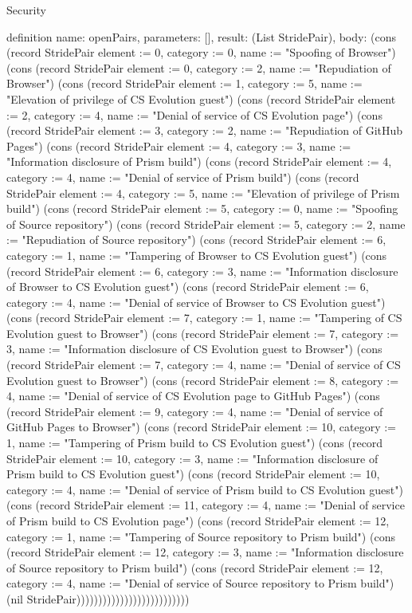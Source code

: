 \begin{lexlean}{Security}
\begin{semanticmodule}
definition{
  name: openPairs,
  parameters: [],
  result: (List StridePair),
  body: (cons (record StridePair {element := 0, category := 0, name := "Spoofing of Browser"}) (cons (record StridePair {element := 0, category := 2, name := "Repudiation of Browser"}) (cons (record StridePair {element := 1, category := 5, name := "Elevation of privilege of CS Evolution guest"}) (cons (record StridePair {element := 2, category := 4, name := "Denial of service of CS Evolution page"}) (cons (record StridePair {element := 3, category := 2, name := "Repudiation of GitHub Pages"}) (cons (record StridePair {element := 4, category := 3, name := "Information disclosure of Prism build"}) (cons (record StridePair {element := 4, category := 4, name := "Denial of service of Prism build"}) (cons (record StridePair {element := 4, category := 5, name := "Elevation of privilege of Prism build"}) (cons (record StridePair {element := 5, category := 0, name := "Spoofing of Source repository"}) (cons (record StridePair {element := 5, category := 2, name := "Repudiation of Source repository"}) (cons (record StridePair {element := 6, category := 1, name := "Tampering of Browser to CS Evolution guest"}) (cons (record StridePair {element := 6, category := 3, name := "Information disclosure of Browser to CS Evolution guest"}) (cons (record StridePair {element := 6, category := 4, name := "Denial of service of Browser to CS Evolution guest"}) (cons (record StridePair {element := 7, category := 1, name := "Tampering of CS Evolution guest to Browser"}) (cons (record StridePair {element := 7, category := 3, name := "Information disclosure of CS Evolution guest to Browser"}) (cons (record StridePair {element := 7, category := 4, name := "Denial of service of CS Evolution guest to Browser"}) (cons (record StridePair {element := 8, category := 4, name := "Denial of service of CS Evolution page to GitHub Pages"}) (cons (record StridePair {element := 9, category := 4, name := "Denial of service of GitHub Pages to Browser"}) (cons (record StridePair {element := 10, category := 1, name := "Tampering of Prism build to CS Evolution guest"}) (cons (record StridePair {element := 10, category := 3, name := "Information disclosure of Prism build to CS Evolution guest"}) (cons (record StridePair {element := 10, category := 4, name := "Denial of service of Prism build to CS Evolution guest"}) (cons (record StridePair {element := 11, category := 4, name := "Denial of service of Prism build to CS Evolution page"}) (cons (record StridePair {element := 12, category := 1, name := "Tampering of Source repository to Prism build"}) (cons (record StridePair {element := 12, category := 3, name := "Information disclosure of Source repository to Prism build"}) (cons (record StridePair {element := 12, category := 4, name := "Denial of service of Source repository to Prism build"}) (nil StridePair))))))))))))))))))))))))))
}


\end{semanticmodule}
\end{lexlean}

